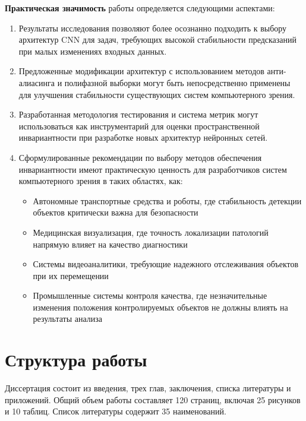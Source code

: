 \textbf{Практическая значимость} работы определяется следующими аспектами:

\begin{enumerate}
    \item Результаты исследования позволяют более осознанно подходить к выбору архитектур CNN для задач, требующих высокой стабильности предсказаний при малых изменениях входных данных.
    
    \item Предложенные модификации архитектур с использованием методов анти-алиасинга и полифазной выборки могут быть непосредственно применены для улучшения стабильности существующих систем компьютерного зрения.
    
    \item Разработанная методология тестирования и система метрик могут использоваться как инструментарий для оценки пространственной инвариантности при разработке новых архитектур нейронных сетей.
    
    \item Сформулированные рекомендации по выбору методов обеспечения инвариантности имеют практическую ценность для разработчиков систем компьютерного зрения в таких областях, как:
    \begin{itemize}
        \item Автономные транспортные средства и роботы, где стабильность детекции объектов критически важна для безопасности
        \item Медицинская визуализация, где точность локализации патологий напрямую влияет на качество диагностики
        \item Системы видеоаналитики, требующие надежного отслеживания объектов при их перемещении
        \item Промышленные системы контроля качества, где незначительные изменения положения контролируемых объектов не должны влиять на результаты анализа
    \end{itemize}
\end{enumerate}

\section*{Структура работы}
\label{intro:structure}

Диссертация состоит из введения, трех глав, заключения, списка литературы и приложений. Общий объем работы составляет 120 страниц, включая 25 рисунков и 10 таблиц. Список литературы содержит 35 наименований.

